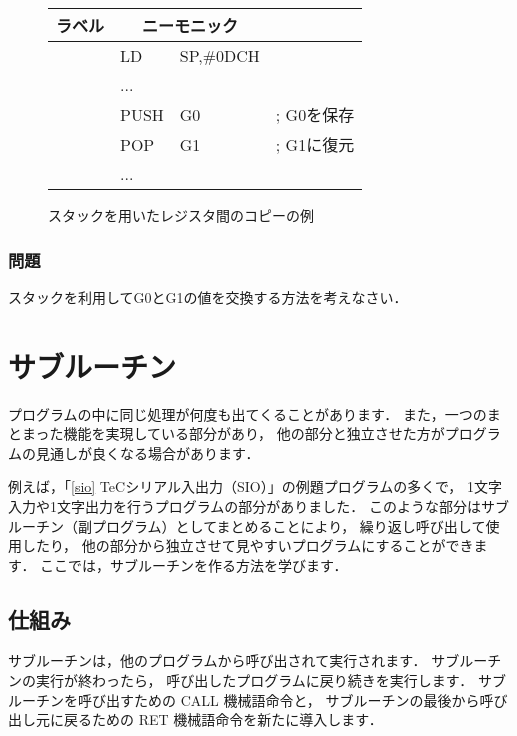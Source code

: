 \begin{figure}[bt]
{\tt\small\begin{center}
\begin{tabular}{|l|l l l|}
\hline
ラベル & \multicolumn{2}{|c}{ニーモニック} & \\
\hline
    & LD   & SP,\#0DCH&            \\
    & ...  &          &            \\
    & PUSH & G0       & ; G0を保存 \\
    & POP  & G1       & ; G1に復元 \\
    & ...  &        & \\
\hline
\end{tabular}
\end{center}}
\caption{スタックを用いたレジスタ間のコピーの例}
\label{fig:chap6:regcopy}
\end{figure}

\vfill
\subsubsection{問題}
スタックを利用してG0とG1の値を交換する方法を考えなさい．
\vfill

\newpage
\section{サブルーチン}

プログラムの中に同じ処理が何度も出てくることがあります．
また，一つのまとまった機能を実現している部分があり，
他の部分と独立させた方がプログラムの見通しが良くなる場合があります．

例えば，「\ref{sio} TeCシリアル入出力（SIO）」の例題プログラムの多くで，
1文字入力や1文字出力を行うプログラムの部分がありました．
このような部分はサブルーチン（副プログラム）としてまとめることにより，
繰り返し呼び出して使用したり，
他の部分から独立させて見やすいプログラムにすることができます．
ここでは，サブルーチンを作る方法を学びます．

\subsection{仕組み}

サブルーチンは，他のプログラムから呼び出されて実行されます．
サブルーチンの実行が終わったら，
呼び出したプログラムに戻り続きを実行します．
サブルーチンを呼び出すための CALL 機械語命令と，
サブルーチンの最後から呼び出し元に戻るための RET 機械語命令を新たに導入します．

